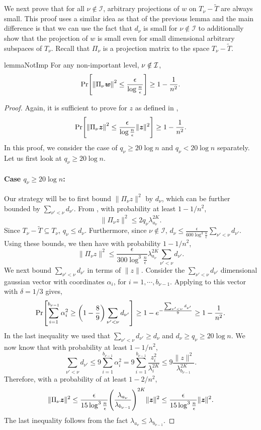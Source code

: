 \documentclass[11pt]{article}
\renewcommand{\norm}[1]{\ensuremath{\left\lVert #1 \right\rVert}}
\let\originalleft\left
\let\originalright\right
\renewcommand{\left}{\mathopen{}\mathclose\bgroup\originalleft}
\renewcommand{\right}{\aftergroup\egroup\originalright}
\newcommand\ww{\boldsymbol{\mathit{w}}}
\newcommand\zz{\boldsymbol{\mathit{z}}}
\newcommand\Ttil{{\tilde{\mathit{T}}}}
\begin{document}
We next prove that for all $\nu\notin \mathcal{I}$, arbitrary projections of $\ww$ on $T_{\nu}-\Ttil$ are always small. This proof uses a similar idea as that of the previous lemma and the main difference is that we can use the fact that $d_{\nu}$ is small for $\nu\notin \mathcal{I}$ to additionally show that the projection of $\ww$ is small even for small dimensional arbitrary subspaces of $T_{\nu}$. Recall that $\Pi_\nu$ is a projection matrix to the space $T_{\nu}-\Ttil$.
\begin{restatable}{lemma}{NotImp}\label{lem:NotImp}
For any non-important level, $\nu \notin \cal{I}$,
\[
\Pr\left[\norm{\Pi_{\nu}\ww}^2 \leq \frac{\epsilon}{\log\frac{n}{\epsilon}} \right] \geq 1-\frac{1}{n^{2}}.
\]
\end{restatable}

\begin{proof}
Again, it is sufficient to prove for $\zz$ as defined in ,
\[
\Pr\left[\norm{\Pi_{\nu}\zz}^2 \leq \frac{\epsilon}{\log\frac{n}{\epsilon}}\|\zz\|^2 \right] \geq 1-\frac{1}{n^{2}}.
\]
In this proof, we consider the case of $q_{\nu}\geq 20\log n$ and $q_{\nu}<20\log n$ separately. Let us first look at $q_{\nu}\geq 20\log n$.
\paragraph{Case $q_{\nu}\geq 20\log n$:}
Our strategy will be to first bound $\|\Pi_{\nu}\zz\|^2$ by $d_{\nu}$, which can be further bounded by $\sum_{\nu'<\nu}d_{\nu'}$.
From , with probability at least $1-1/n^2$,
\[
\|\Pi_{\nu}\zz\|^2 \leq 2q_{\nu}\lambda_{a_{\nu}}^{2K}.
\]
Since $T_{\nu}-\tilde{T}\subseteq T_{\nu}$, $q_{\nu}\leq d_{\nu}$. Furthermore, since $\nu \notin \mathcal{I}$, $d_{\nu}\leq \frac{\epsilon}{600\log^3 \frac{n}{\epsilon}}\sum_{\nu'<\nu}d_{\nu'}$. Using these bounds, we then have with probability $1-1/n^2$,  
\[
\|\Pi_{\nu}\zz\|^2 \leq \frac{\epsilon}{300\log^3 \frac{n}{\epsilon}}\lambda_{a_{\nu}}^{2K}\sum_{\nu'<\nu}d_{\nu'}.
\]
We next bound $\sum_{\nu'<\nu}d_{\nu'}$ in terms of $\|\zz\|$. Consider the $\sum_{\nu'<\nu}d_{\nu'}$ dimensional gaussian vector with coordinates $\alpha_i$, for $i = 1, \cdots, b_{\nu-1}$. Applying  to this vector with $\delta=1/3$ gives,
\[
\Pr\left[\sum_{i=1}^{b_{\nu-1}} \alpha_i^2 \geq \left(1-\frac{8}{9}\right)\sum_{\nu'<\nu}d_{\nu'}\right] \geq 1- e^{-\frac{\sum_{\nu'<\nu}d_{\nu'}}{9}} \geq 1-\frac{1}{n^2}.
\]
In the last inequality we used that $\sum_{\nu'<\nu}d_{\nu'}\geq d_{\nu}$ and $d_{\nu}\geq q_{\nu}\geq 20\log n$. We now know that with probability at least $1-1/n^2$,
\[
\sum_{\nu'<\nu}d_{\nu'} \leq 9\sum_{i=1}^{b_{\nu-1}}\alpha_i^2 = 9\sum_{i=1}^{b_{\nu-1}}\frac{\zz_i^2}{\lambda_i^{2K} }\leq 9\frac{\|\zz\|^2}{\lambda_{b_{\nu-1}}^{2K}}.
\]
Therefore, with a probability of at least $1-2/n^2$,
\[
\|\Pi_{\nu}\zz\|^2 \leq \frac{\epsilon}{15\log^3 \frac{n}{\epsilon}}\left(\frac{\lambda_{a_{\nu}}}{\lambda_{b_{\nu-1}}}\right)^{2K}\|\zz\|^2 \leq  \frac{\epsilon}{15\log^3 \frac{n}{\epsilon}}\|\zz\|^2.
\]
The last inequality follows from the fact $\lambda_{a_{\nu}} \leq \lambda_{b_{\nu-1}}$.

\end{proof}
\end{document}
